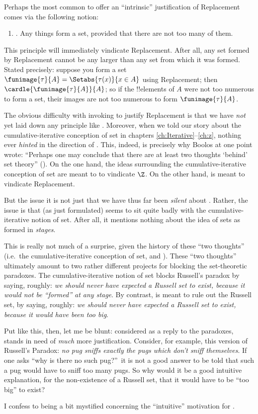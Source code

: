 \documentclass[../../../include/open-logic-section]{subfiles}
\begin{document}
Perhaps the most common to offer an ``intrinsic'' justification of Replacement comes via the following notion:
\begin{enumerate}
	\item[] \limofsize. Any things form a set, provided that there are not too many of them.
\end{enumerate}
This principle will immediately vindicate Replacement. After all, any set formed by Replacement cannot be any larger than any set from which it was formed. Stated precisely: suppose you form a set $\funimage{\tau}{A} = \Setabs{\tau(x)}{x \in A}$ using Replacement; then $\cardle{\funimage{\tau}{A}}{A}$; so if the !!{element}s of $A$ were not too numerous to form a set, their images are not too numerous to form $\funimage{\tau}{A}$. 

The obvious difficulty with invoking \limofsize{} to justify Replacement is that we have \emph{not} yet laid down any principle like \limofsize. Moreover, when we told our story about the cumulative-iterative conception of set in chapters \ref{ch:Iterative}--\ref{ch:z}, nothing ever \emph{hinted} in the direction of \limofsize. This, indeed, is precisely why Boolos at one point wrote: ``Perhaps one may conclude that there are at least two thoughts `behind' set theory'' (\citeyear[19]{Boolos1989}). On the one hand, the ideas surrounding the cumulative-iterative conception of set are meant to to vindicate $\Z$. On the other hand, \limofsize{} is meant to vindicate Replacement. 

But the issue it is not just that we have thus far been \emph{silent} about \limofsize. Rather, the issue is that \limofsize{} (as just formulated) seems to sit quite badly with the cumulative-iterative notion of set. After all, it mentions nothing about the idea of sets as formed in \emph{stages}.

This is really not much of a surprise, given the history of these ``two thoughts'' (i.e.\ the cumulative-iterative conception of set, and \limofsize). These ``two thoughts'' ultimately amount to two rather  different projects for blocking the set-theoretic paradoxes. The cumulative-iterative notion of set blocks Russell's paradox by saying, roughly: \emph{we should never have expected a Russell set to exist, because it would not be ``formed'' at any stage}. By contrast, \limofsize{} is meant to rule out the Russell set, by saying, roughly: \emph{we should never have expected a Russell set to exist, because it would have been too big}. 

Put like this, then, let me be blunt: considered as a reply to the paradoxes, \limofsize{} stands in need of \emph{much} more justification. Consider, for example, this version of Russell's Paradox: \emph{no pug sniffs exactly the pugs which don't sniff themselves}. If one asks ``why is there no such pug?''\ it is not a good answer to be told that such a pug would have to sniff too many pugs. So why would it be a good intuitive explanation, for the non-existence of a Russell set, that it would have to be ``too big'' to exist? 

I confess to being a bit mystified concerning the ``intuitive'' motivation for \limofsize. 
\end{document}
